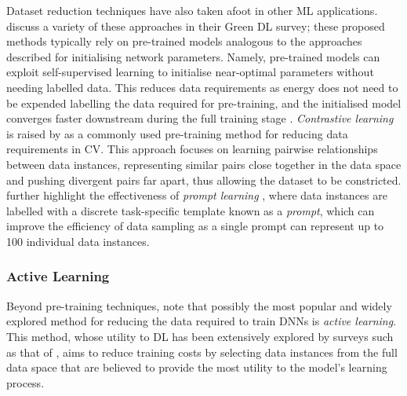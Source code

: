 \documentclass[a4paper, 11pt]{report}
\begin{document}
    Dataset reduction techniques have also taken afoot in other ML applications. \citet{xu-2021} discuss a variety of these approaches in their Green DL survey; these proposed methods typically rely on pre-trained models analogous to the approaches described for initialising network parameters. Namely, pre-trained models can exploit self-supervised learning to initialise near-optimal parameters without needing labelled data. This reduces data requirements as energy does not need to be expended labelling the data required for pre-training, and the initialised model converges faster downstream during the full training stage \citep{xu-2021}. \emph{Contrastive learning} \citep{chen-2020} is raised by \citet{xu-2021} as a commonly used pre-training method for reducing data requirements in CV. This approach focuses on learning pairwise relationships between data instances, representing similar pairs close together in the data space and pushing divergent pairs far apart, thus allowing the dataset to be constricted. \citet{xu-2021} further highlight the effectiveness of \emph{prompt learning} \citep{liu-2021}, where data instances are labelled with a discrete task-specific template known as a \emph{prompt}, which can improve the efficiency of data sampling as a single prompt can represent up to 100 individual data instances. 


    \subsubsection{Active Learning}
    \label{section: active-learning}

    Beyond pre-training techniques, \citet{xu-2021} note that possibly the most popular and widely explored method for reducing the data required to train DNNs is \emph{active learning}. This method, whose utility to DL has been extensively explored by surveys such as that of \citet{ren-2021}, aims to reduce training costs by selecting data instances from the full data space that are believed to provide the most utility to the model's learning process. 
\end{document}
